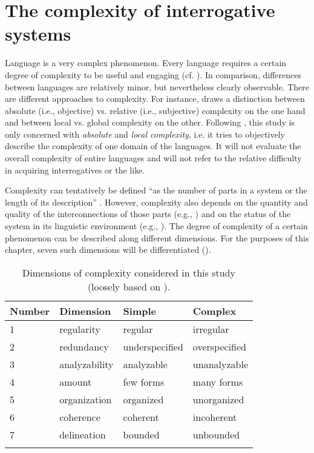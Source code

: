 \documentclass[output=paper,hidelinks]{langscibook}
\begin{document}
\section{The complexity of interrogative systems}\label{sec2}

Language is a very complex phenomenon. Every language requires a certain degree of complexity to be useful and engaging (cf. \citealt{Norman2010}). In comparison, differences between languages are relatively minor, but nevertheless clearly observable. There are different approaches to complexity. For instance, \citet{Miestamo2008grammatical} draws a distinction between absolute (i.e., objective) vs. relative (i.e., subjective) complexity on the one hand and between local vs. global complexity on the other. Following \citet{Miestamo2008grammatical}, this study is only concerned with \textit{absolute} and \textit{local complexity}, i.e. it tries to objectively describe the complexity of one domain of the  languages. It will not evaluate the overall complexity of entire languages and will not refer to the relative difficulty in acquiring  interrogatives or the like.

Complexity can tentatively be defined ``as the number of parts in a system or the length of its description'' \citep[27]{Miestamo2008grammatical}. However, complexity also depends on the quantity and quality of the interconnections of those parts (e.g., \citealt[viii]{Karlsson2008}) and on the status of the system in its linguistic environment (e.g., \citealt{Turvey2009}). The degree of complexity of a certain phenomenon can be described along different dimensions. For the purposes of this chapter, seven such dimensions will be differentiated ().

\begin{table}
\caption{Dimensions of complexity considered in this study (loosely based on \citealt{McWhorter2007, Karlsson2008, Turvey2009, Trudgill2011}).}
\label{tab:dimensions}
 \begin{tabular}{llll} 
  \lsptoprule
  Number & Dimension & Simple & Complex\\
  \midrule
  1 & regularity & regular & irregular\\
  2 & redundancy & underspecified & overspecified\\
  3 & analyzability & analyzable & unanalyzable\\
  4 & amount & few forms & many forms\\
  5 & organization & organized & unorganized\\
  6 & coherence & coherent & incoherent\\
  7 & delineation & bounded & unbounded\\
  \lspbottomrule
 \end{tabular}
\end{table}
\end{document}
